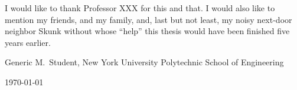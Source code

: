 

I would like to thank Professor XXX for this and that.  I would also
like to mention my friends, and my family, and, last but not least, my
noisy next-door neighbor Skunk without whose ``help'' this thesis would have
been finished five years earlier.

\bigskip\medskip

\noindent \hfill Generic M.\ Student, New York University Polytechnic School of Engineering

\hfill \today

